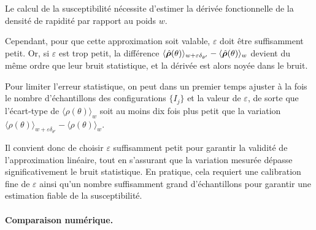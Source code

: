 Le calcul de la susceptibilité nécessite d’estimer la dérivée fonctionnelle de la densité de rapidité par rapport au poids \( w \). 

Cependant, pour que cette approximation soit valable, \( \varepsilon \) doit être suffisamment petit. Or, si \( \varepsilon \) est trop petit, la différence  \( \langle \hat{\bm{\rho}}(\theta) \rangle_{w + \varepsilon \delta_{\theta'}} -  \langle\hat{\bm{\rho}} (\theta) \rangle_w \) devient du même ordre que leur bruit statistique, et la dérivée est alors noyée dans le bruit.

Pour limiter l'erreur statistique, on peut dans un premier temps ajuster à la fois le nombre d’échantillons des configurations \( \{I_j\} \) et la valeur de \( \varepsilon \), de sorte que l’écart-type de \( \langle \rho(\theta) \rangle_w \) soit au moins dix fois plus petit que la variation 
\(
\langle \rho(\theta) \rangle_{w + \varepsilon \delta_{\theta'}} - \langle \rho(\theta) \rangle_w.
\)

Il convient donc de choisir \( \varepsilon \) suffisamment petit pour garantir la validité de l'approximation linéaire, tout en s'assurant que la variation mesurée dépasse significativement le bruit statistique. En pratique, cela requiert une calibration fine de \( \varepsilon \) ainsi qu’un nombre suffisamment grand d’échantillons pour garantir une estimation fiable de la susceptibilité.


\paragraph{Comparaison numérique.}
%

